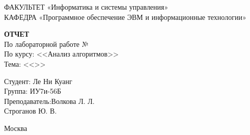 \begin{titlepage}
	{\doublespacing \normalsize \raggedright ФАКУЛЬТЕТ \hspace{25mm} «Информатика и системы управления»\\
	КАФЕДРА \hspace{5mm} «Программное обеспечение ЭВМ и информационные технологии»\\}

	\vspace{30mm}
	
	\textbf{ОТЧЕТ}\\
	По лабораторной работе №\lab\\
	По курсу: <<Анализ алгоритмов>>\\
	Тема: <<\topic>>\\

	\vspace{60mm}

	\hspace{70mm} Студент:      \hfill Ле Ни Куанг\\
	\hspace{70mm} Группа:       \hfill ИУ7и-56Б\\
	\hspace{70mm} Преподаватель:\hfill Волкова Л. Л.\\
								\hfill Строганов Ю. В.\\

	\vfill
	
	Москва\\
	\the\year
\end{titlepage}

